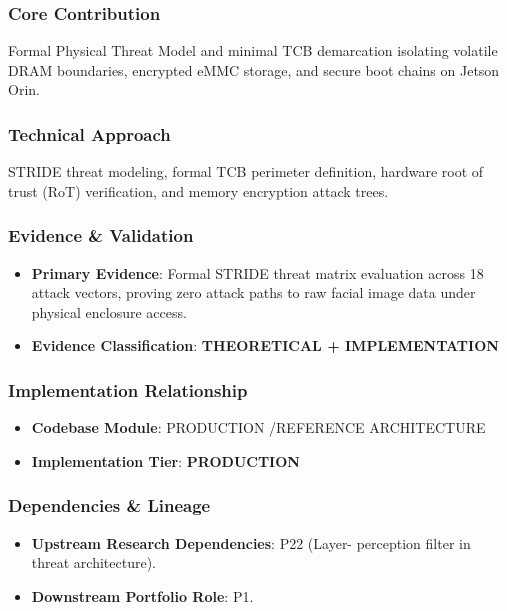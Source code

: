 \documentclass[11pt,letterpaper]{article}
\begin{document}
\subsubsection{Core Contribution}
Formal Physical Threat Model and minimal TCB demarcation isolating volatile DRAM boundaries, encrypted eMMC storage, and secure boot chains on Jetson Orin.

\subsubsection{Technical Approach}
STRIDE threat modeling, formal TCB perimeter definition, hardware root of trust (RoT) verification, and memory encryption attack trees.

\subsubsection{Evidence \& Validation}
\begin{itemize}[leftmargin=*]
    \item \textbf{Primary Evidence}: Formal STRIDE threat matrix evaluation across 18 attack vectors, proving zero attack paths to raw facial image data under physical enclosure access.
    \item \textbf{Evidence Classification}: \textbf{THEORETICAL + IMPLEMENTATION}
\end{itemize}

\subsubsection{Implementation Relationship}
\begin{itemize}[leftmargin=*]
    \item \raggedright \textbf{Codebase Module}: PRODUCTION /\allowbreak  REFERENCE ARCHITECTURE
    \item \textbf{Implementation Tier}: \textbf{PRODUCTION}
\end{itemize}

\subsubsection{Dependencies \& Lineage}
\begin{itemize}[leftmargin=*]
    \item \textbf{Upstream Research Dependencies}: P22 (Layer- perception filter in threat architecture).
    \item \textbf{Downstream Portfolio Role}: P1.
\end{itemize}
\end{document}
